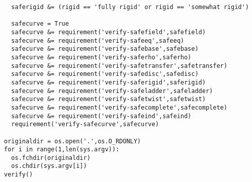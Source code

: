 \begin{lstlisting}
  saferigid &= (rigid == 'fully rigid' or rigid == 'somewhat rigid')

  safecurve = True
  safecurve &= requirement('verify-safefield',safefield)
  safecurve &= requirement('verify-safeeq',safeeq)
  safecurve &= requirement('verify-safebase',safebase)
  safecurve &= requirement('verify-saferho',saferho)
  safecurve &= requirement('verify-safetransfer',safetransfer)
  safecurve &= requirement('verify-safedisc',safedisc)
  safecurve &= requirement('verify-saferigid',saferigid)
  safecurve &= requirement('verify-safeladder',safeladder)
  safecurve &= requirement('verify-safetwist',safetwist)
  safecurve &= requirement('verify-safecomplete',safecomplete)
  safecurve &= requirement('verify-safeind',safeind)
  requirement('verify-safecurve',safecurve)

originaldir = os.open('.',os.O_RDONLY)
for i in range(1,len(sys.argv)):
  os.fchdir(originaldir)
  os.chdir(sys.argv[i])
verify()
\end{lstlisting}